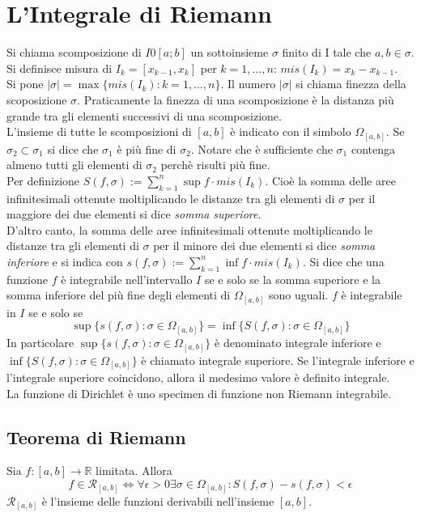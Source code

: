 \documentclass{article}
\begin{document}
\section{L'Integrale di Riemann}

Si chiama scomposizione di $I0[a;b]$ un sottoinsieme $\sigma$ finito di I tale che $a,b \in \sigma$.\\

Si definisce misura di $I_k=[x_{k-1}, x_k]$ per $k=1, \dots , n$: $mis(I_k)=x_k-x_{k-1}$.\\
Si pone $|\sigma|=\max\{mis(I_k):k=1, \dots, n\}$. Il numero $|\sigma|$ si chiama finezza della scoposizione $\sigma$. Praticamente la finezza di una scomposizione è la distanza più grande tra gli elementi successivi di una scomposizione.\\
\noindent L'insieme di tutte le scomposizioni di $[a,b]$ è indicato con il simbolo $\Omega_{[a,b]}$. Se $\sigma_2 \subset \sigma_1$ si dice che $\sigma_1$ è più fine di $\sigma_2$. Notare che è sufficiente che $\sigma_1$ contenga almeno tutti gli elementi di $\sigma_2$ perchè risulti più fine.\\
Per definizione $S(f, \sigma):= \sum^n_{k=1}\sup f \cdot mis(I_k)$. Cioè la somma delle aree infinitesimali ottenute moltiplicando le distanze tra gli elementi di $\sigma$ per il maggiore dei due elementi si dice \textit{somma superiore}.\\
\noindent D'altro canto, la somma delle aree infinitesimali ottenute moltiplicando le distanze tra gli elementi di $\sigma$ per il minore dei due elementi si dice \textit{somma inferiore} e si indica con $s(f,\sigma):=\sum^n_{k=1}\inf f \cdot mis(I_k)$. Si dice che una funzione $f$ è integrabile nell'intervallo $I$ se e solo se la somma superiore e la somma inferiore del più fine degli elementi di $\Omega_{[a,b]}$ sono uguali. $f$ è integrabile in $I$ se e solo se
\begin{equation*}
	\sup\{s(f,\sigma): \sigma \in \Omega_{[a,b]}\}=\inf\{S(f,\sigma): \sigma \in \Omega_{[a,b]}\}
\end{equation*}
In particolare $\sup\{s(f,\sigma): \sigma \in \Omega_{[a,b]}\}$ è denominato integrale inferiore e $\inf\{S(f,\sigma): \sigma \in \Omega_{[a,b]}\}$ è chiamato integrale superiore. Se l'integrale inferiore e l'integrale superiore coincidono, allora il medesimo valore è definito integrale.\\
La funzione di Dirichlet è uno specimen di funzione non Riemann integrabile.

\subsection{Teorema di Riemann}
Sia $f:[a,b]\rightarrow \mathbb{R}$ limitata. Allora
\begin{equation*}
	f \in \mathcal{R}_{[a,b]} \iff \forall \epsilon > 0 \exists \sigma \in \Omega_{[a,b]}: S(f, \sigma )-s(f, \sigma )<\epsilon
\end{equation*}
$\mathcal{R}_{[a,b]}$ è l'insieme delle funzioni derivabili nell'insieme $[a,b]$.
\end{document}
